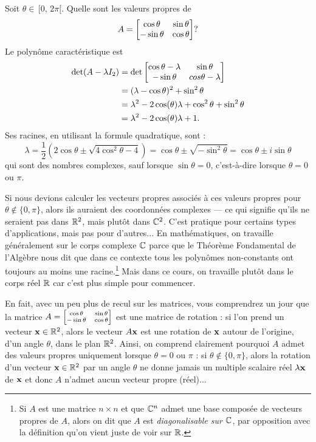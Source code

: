 \begin{myexample} Soit $\theta\in\,[0,\, 2\pi[$. Quelle sont les valeurs propres de  
$$
A = \left[ \begin{matrix} \cos \theta & \sin \theta \\ -\sin \theta & \cos \theta \end{matrix} \right]?
$$
Le polynôme caractéristique est
\begin{align*}
\det( A-\lambda I_2 )& = \det\left[ \begin{matrix}  \cos \theta-\lambda  & \sin \theta \\ -\sin \theta & cos \theta-\lambda \end{matrix} \right]\\
& = (\lambda-\cos \theta)^2 + \sin^2\theta\\&= \lambda^2 -2\cos(\theta)\lambda + \cos^2\theta + \sin^2\theta\\
&= \lambda^2 -2\cos(\theta)\lambda +1.
\end{align*}
Ses racines, en utilisant la formule quadratique, sont :
$$
\lambda = \frac{1}{2}\left(2\cos\theta \pm \sqrt{4\cos^2\theta - 4}\right)
= \cos\theta \pm \sqrt{-\sin^2\theta} = \cos\theta \pm i \sin\theta
$$
qui sont des nombres complexes, sauf lorsque $\sin \theta=0$, c'est-\`a-dire lorsque $\theta=0$ ou $\pi$.  

Si nous devions calculer les vecteurs propres associés à ces
valeurs propres pour $\theta\notin\{0, \pi\}$, alors ils auraient des coordonnées complexes --- ce qui signifie
qu'ils ne seraient pas dans $\mathbb{R}^2$, mais plutôt dans $\mathbb{C}^2$.  C'est pratique pour 
certains types d'applications, mais pas pour d'autres...
En mathématiques, on travaille généralement sur le corps complexe $\mathbb{C}$ parce que le Théorème Fondamental de l'Algèbre nous dit que dans ce contexte tous les polynômes non-constants ont toujours au moins une racine.\footnote{\label{diagC}Si $A$ est une matrice $n\times n$ et que $\mathbb{C}^n$ admet une base compos\'ee de vecteurs propres de $A$, alors on dit que $A$ est {\it diagonalisable sur $\mathbb{C}$}, par opposition avec la définition qu'on vient juste de voir sur $\mathbb{R}$.} Mais dans ce cours, on travaille plutôt dans le corps réel $\mathbb{R}$ car c'est plus simple pour commencer.

En fait, avec un peu plus de recul sur les matrices, vous comprendrez un jour que la matrice  $
A = \scriptsize\left[ \begin{matrix} \cos \theta & \sin \theta \\ -\sin \theta & \cos \theta \end{matrix} \right]
$ est une matrice de rotation : si l'on prend un vecteur $\mathbf{x}\in\mathbb{R}^2$, alors le vecteur $A\mathbf{x}$ est une rotation de $\mathbf{x}$ autour de l'origine, d'un angle $\theta$, dans le plan $\mathbb{R}^2$.
Ainsi, on comprend clairement pourquoi $A$ admet des valeurs propres uniquement lorsque $\theta=0$ ou $\pi$ : si $\theta\notin\{0,\pi\}$, alors la rotation d'un vecteur $\mathbf{x} \in \mathbb{R}^2$ par un angle $\theta$ ne donne jamais un multiple scalaire réel $\lambda \mathbf{x}$ de $\mathbf{x}$ et donc $A$ n'admet aucun vecteur propre (réel)...
\end{myexample}

